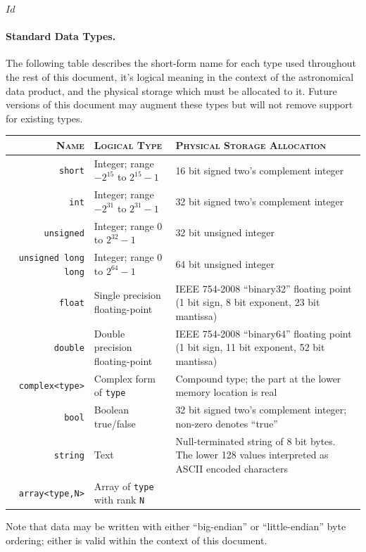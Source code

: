 \svnInfo $Id$

\paragraph{Standard Data Types.}

The following table describes the short-form name for each type used
throughout the rest of this document, it's logical meaning in the context of
the astronomical data product, and the physical storage which must be
allocated to it.  Future versions of this document
may augment these types but will not remove support for existing types.

\begin{center}
  \begin{tabular}{rlp{7.8cm}}
    \textsc{Name}        & \textsc{Logical Type}                  & \textsc{Physical Storage Allocation} \\
    \hline
    \verb|short|         & Integer; range $-2^{15}$ to $2^{15}-1$ & 16 bit signed two's complement integer \\
    \verb|int|           & Integer; range $-2^{31}$ to $2^{31}-1$ & 32 bit signed two's complement integer \\
    \verb|unsigned|      & Integer; range $0$ to $2^{32}-1$       & 32 bit unsigned integer \\
    \verb|unsigned long long| & Integer; range $0$ to $2^{64}-1$  & 64 bit unsigned integer \\
    \verb|float|         & Single precision floating-point        & IEEE 754-2008 \cite{ieee.754-2008} ``binary32'' floating point (1 bit sign, 8 bit exponent, 23 bit mantissa) \\
    \verb|double|        & Double precision floating-point        & IEEE 754-2008 ``binary64'' floating point (1 bit sign, 11 bit exponent, 52 bit mantissa)\\
    \verb|complex<type>| & Complex form of \verb|type|            & Compound type; the part at the lower memory location is real \\
    \verb|bool|          & Boolean true/false                     & 32 bit signed two's complement integer; non-zero denotes ``true''\\
    \verb|string|        & Text                                   & Null-terminated string of 8 bit bytes. The lower 128 values interpreted as ASCII encoded characters\\
    \verb|array<type,N>| & Array of \verb|type| with rank \texttt{N} & \\
    \hline
  \end{tabular}
\end{center}

Note that data may be written with either ``big-endian'' or ``little-endian''
byte ordering; either is valid within the context of this document.

